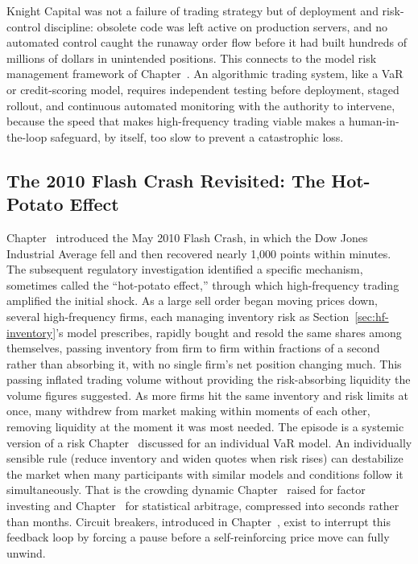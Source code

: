 \documentclass[../ai_in_finance]{subfiles}
\begin{document}
Knight Capital was not a failure of trading strategy but of deployment and risk-control discipline: obsolete code was left active on production servers, and no automated control caught the runaway order flow before it had built hundreds of millions of dollars in unintended positions. This connects to the model risk management framework of Chapter~. An algorithmic trading system, like a VaR or credit-scoring model, requires independent testing before deployment, staged rollout, and continuous automated monitoring with the authority to intervene, because the speed that makes high-frequency trading viable makes a human-in-the-loop safeguard, by itself, too slow to prevent a catastrophic loss.

\subsection{The 2010 Flash Crash Revisited: The Hot-Potato Effect}

Chapter~ introduced the May 2010 Flash Crash, in which the Dow Jones Industrial Average fell and then recovered nearly 1,000 points within minutes. The subsequent regulatory investigation identified a specific mechanism, sometimes called the ``hot-potato effect,'' through which high-frequency trading amplified the initial shock. As a large sell order began moving prices down, several high-frequency firms, each managing inventory risk as Section~\ref{sec:hf-inventory}'s model prescribes, rapidly bought and resold the same shares among themselves, passing inventory from firm to firm within fractions of a second rather than absorbing it, with no single firm's net position changing much. This passing inflated trading volume without providing the risk-absorbing liquidity the volume figures suggested. As more firms hit the same inventory and risk limits at once, many withdrew from market making within moments of each other, removing liquidity at the moment it was most needed. The episode is a systemic version of a risk Chapter~ discussed for an individual VaR model. An individually sensible rule (reduce inventory and widen quotes when risk rises) can destabilize the market when many participants with similar models and conditions follow it simultaneously. That is the crowding dynamic Chapter~ raised for factor investing and Chapter~ for statistical arbitrage, compressed into seconds rather than months. Circuit breakers, introduced in Chapter~, exist to interrupt this feedback loop by forcing a pause before a self-reinforcing price move can fully unwind.
\end{document}
